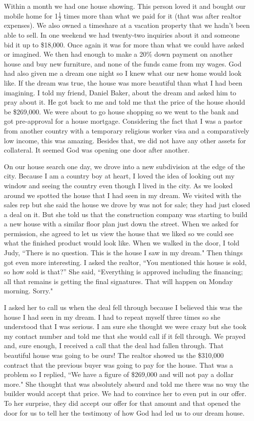 \documentclass[oneside,12pt]{book}
\begin{document}
Within a month we had one house showing. This person loved it and bought our mobile home for 1$\frac{1}{2}$ times more than what we paid for it (that was after realtor expenses). We also owned a timeshare at a vacation property that we hadn't been able to sell. In one weekend we had twenty-two inquiries about it and someone bid it up to \$18,000. Once again it was for more than what we could have asked or imagined. We then had enough to make a 20\% down payment on another house and buy new furniture, and none of the funds came from my wages. God had also given me a dream one night so I knew what our new home would look like. If the dream was true, the house was more beautiful than what I had been imagining. I told my friend, Daniel Baker, about the dream and asked him to pray about it. He got back to me and told me that the price of the house should be \$269,000. We were about to go house shopping so we went to the bank and got pre-approval for a house mortgage. Considering the fact that I was a pastor from another country with a temporary religious worker visa and a comparatively low income, this was amazing. Besides that, we did not have any other assets for collateral. It seemed God was opening one door after another.

On our house search one day, we drove into a new subdivision at the edge of the city. Because I am a country boy at heart, I loved the idea of looking out my window and seeing the country even though I lived in the city. As we looked around we spotted the house that I had seen in my dream. We visited with the sales rep but she said the house we drove by was not for sale; they had just closed a deal on it. But she told us that the construction company was starting to build a new house with a similar floor plan just down the street. When we asked for permission, she agreed to let us view the house that we liked so we could see what the finished product would look like. When we walked in the door, I told Judy, ``There is no question. This is the house I saw in my dream." Then things got even more interesting. I asked the realtor, ``You mentioned this house is sold, so how sold is that?'' She said, ``Everything is approved including the financing; all that remains is getting the final signatures. That will happen on Monday morning. Sorry." 

I asked her to call us when the deal fell through because I believed this was the house I had seen in my dream. I had to repeat myself three times so she understood that I was serious. I am sure she thought we were crazy but she took my contact number and told me that she would call if it fell through. We prayed and, sure enough, I received a call that the deal had fallen through. That beautiful house was going to be ours! The realtor showed us the \$310,000 contract that the previous buyer was going to pay for the house. That was a problem so I replied, ``We have a figure of \$269,000 and will not pay a dollar more." She thought that was absolutely absurd and told me there was no way the builder would accept that price. We had to convince her to even put in our offer. To her surprise, they did accept our offer for that amount and that opened the door for us to tell her the testimony of how God had led us to our dream house.
\end{document}
